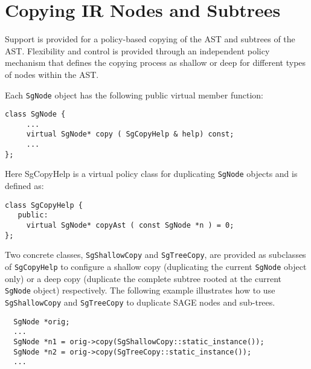 \section { Copying IR Nodes and Subtrees}

    Support is provided for a policy-based copying of the AST and subtrees
of the AST.  Flexibility and control is provided through an independent
policy mechanism that defines the copying process as shallow or deep for
different types of nodes within the AST.


  Each {\tt SgNode} object has the following public virtual member function: 

{\indent
{\mySmallFontSize

\begin{verbatim}
class SgNode {
     ...
     virtual SgNode* copy ( SgCopyHelp & help) const;
     ...
};
\end{verbatim}
}}

  Here SgCopyHelp is a virtual policy class for duplicating 
{\tt SgNode} objects and is defined as:

{\indent
{\mySmallFontSize

\begin{verbatim}
class SgCopyHelp {
   public:
     virtual SgNode* copyAst ( const SgNode *n ) = 0;
};
\end{verbatim}
}}

Two concrete classes, {\tt SgShallowCopy} and {\tt SgTreeCopy}, are provided as 
subclasses of {\tt SgCopyHelp} to configure a shallow copy (duplicating 
the current {\tt SgNode} object only) or a deep copy (duplicate the complete
subtree rooted at the current {\tt SgNode} object) respectively. The following
example illustrates how to use {\tt SgShallowCopy} and {\tt SgTreeCopy} 
to duplicate SAGE nodes and sub-trees.

{\indent
{\mySmallFontSize

\begin{verbatim}
  SgNode *orig;
  ...
  SgNode *n1 = orig->copy(SgShallowCopy::static_instance());
  SgNode *n2 = orig->copy(SgTreeCopy::static_instance());
  ... 
\end{verbatim}
}}

